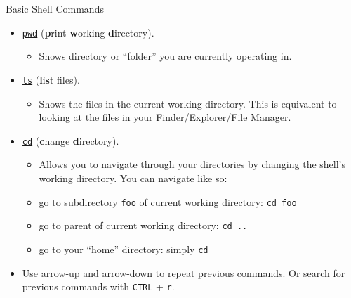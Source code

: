 \documentclass[
  ignorenonframetext,
]{beamer}
\providecommand{\tightlist}{%
  \setlength{\itemsep}{0pt}\setlength{\parskip}{0pt}}
\begin{document}
\begin{frame}[fragile]{Basic Shell Commands}
\protect\hypertarget{basic-shell-commands}{}

\begin{itemize}
\tightlist
\item
  \href{https://en.wikipedia.org/wiki/Pwd}{\texttt{pwd}} (\textbf{p}rint
  \textbf{w}orking \textbf{d}irectory).

  \begin{itemize}
  \tightlist
  \item
    Shows directory or ``folder'' you are currently operating in.
  \end{itemize}
\item
  \href{https://en.wikipedia.org/wiki/Ls}{\texttt{ls}}
  (\textbf{l}i\textbf{s}t files).

  \begin{itemize}
  \tightlist
  \item
    Shows the files in the current working directory. This is equivalent
    to looking at the files in your Finder/Explorer/File Manager.
  \end{itemize}
\item
  \href{https://en.wikipedia.org/wiki/Cd_(command)}{\texttt{cd}}
  (\textbf{c}hange \textbf{d}irectory).

  \begin{itemize}
  \tightlist
  \item
    Allows you to navigate through your directories by changing the
    shell's working directory. You can navigate like so:
  \item
    go to subdirectory \texttt{foo} of current working directory:
    \texttt{cd\ foo}
  \item
    go to parent of current working directory: \texttt{cd\ ..}
  \item
    go to your ``home'' directory: simply \texttt{cd}
  \end{itemize}
\item
  Use arrow-up and arrow-down to repeat previous commands. Or search for
  previous commands with \texttt{CTRL} + \texttt{r}.
\end{itemize}

\end{frame}
\end{document}
